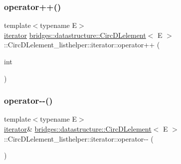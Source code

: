 \subsubsection{\texorpdfstring{operator++()}{operator++()}\hspace{0.1cm}{\footnotesize\ttfamily [2/2]}}
{\footnotesize\ttfamily template$<$typename E$>$ \\
\hyperlink{classbridges_1_1datastructure_1_1_circ_d_lelement_1_1_circ_d_lelement__listhelper_1_1iterator}{iterator} \hyperlink{classbridges_1_1datastructure_1_1_circ_d_lelement}{bridges\+::datastructure\+::\+Circ\+D\+Lelement}$<$ E $>$\+::Circ\+D\+Lelement\+\_\+listhelper\+::iterator\+::operator++ (\begin{DoxyParamCaption}\item[{int}]{ }\end{DoxyParamCaption})\hspace{0.3cm}{\ttfamily [inline]}}

\mbox{\label{classbridges_1_1datastructure_1_1_circ_d_lelement_1_1_circ_d_lelement__listhelper_1_1iterator_a88ebb96d0376f289b8520c33a77f1269}} 
\subsubsection{\texorpdfstring{operator-\/-\/()}{operator--()}\hspace{0.1cm}{\footnotesize\ttfamily [1/2]}}
{\footnotesize\ttfamily template$<$typename E$>$ \\
\hyperlink{classbridges_1_1datastructure_1_1_circ_d_lelement_1_1_circ_d_lelement__listhelper_1_1iterator}{iterator}\& \hyperlink{classbridges_1_1datastructure_1_1_circ_d_lelement}{bridges\+::datastructure\+::\+Circ\+D\+Lelement}$<$ E $>$\+::Circ\+D\+Lelement\+\_\+listhelper\+::iterator\+::operator-\/-\/ (\begin{DoxyParamCaption}{ }\end{DoxyParamCaption})\hspace{0.3cm}{\ttfamily [inline]}}

